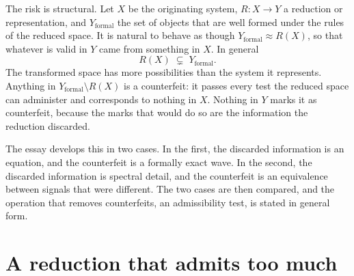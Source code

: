 \documentclass[11pt]{article}
\theoremstyle{definition}
\theoremstyle{remark}
\newcommand{\Yf}{Y_{\mathrm{formal}}}
\begin{document}
The risk is structural. Let $X$ be the originating system, $R:X\to Y$ a reduction or representation, and $\Yf$ the set of objects that are well formed under the rules of the reduced space. It is natural to behave as though $\Yf\approx R(X)$, so that whatever is valid in $Y$ came from something in $X$. In general
\begin{equation}
  R(X)\;\subsetneq\;\Yf .
  \label{eq:strict}
\end{equation}
The transformed space has more possibilities than the system it represents. Anything in $\Yf\setminus R(X)$ is a counterfeit: it passes every test the reduced space can administer and corresponds to nothing in $X$. Nothing in $Y$ marks it as counterfeit, because the marks that would do so are the information the reduction discarded.

The essay develops this in two cases. In the first, the discarded information is an equation, and the counterfeit is a formally exact wave. In the second, the discarded information is spectral detail, and the counterfeit is an equivalence between signals that were different. The two cases are then compared, and the operation that removes counterfeits, an admissibility test, is stated in general form.

\section{A reduction that admits too much}
\end{document}
